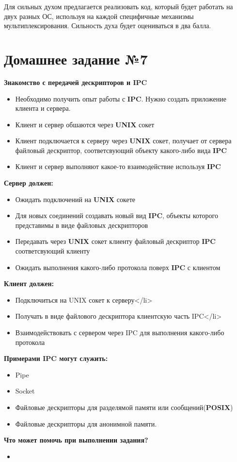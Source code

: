 \documentclass[../../lectures.tex]{subfiles}
\begin{document}
Для сильных духом предлагается реализовать код, который будет работать на двух разных ОС, используя на каждой специфичные механизмы мультиплексирования.
Сильность духа будет оцениваться в два балла.

\section{Домашнее задание №7}
\textbf{Знакомство с передачей дескрипторов и IPC}
\begin{itemize}
    \item Необходимо получить опыт работы с \textbf{IPC}. Нужно создать приложение клиента и сервера.
    \item Клиент и сервер обшаются через \textbf{UNIX} сокет
    \item Клиент подключается к серверу через \textbf{UNIX} сокет, получает от сервера файловый дескриптор, соответсвующий объекту какого-либо вида \textbf{IPC}
    \item Клиент и сервер выполняют какое-то взаимодействие используя \textbf{IPC}
\end{itemize}

\textbf{Сервер должен:}
\begin{itemize}
    \item Ожидать подключений на \textbf{UNIX} сокете
    \item Для новых соединений создавать новый вид \textbf{IPC}, объекты которого представимы в виде файловых дескрипторов
    \item Передавать через \textbf{UNIX} сокет клиенту файловый дескриптор \textbf{IPC} соответсвующий клиенту
    \item Ожидать выполнения какого-либо протокола поверх \textbf{IPC} с клиентом
\end{itemize}

\textbf{Клиент должен:}
\begin{itemize}
    \item Подключиться на UNIX сокет к серверу</li>
    \item Получать в виде файлового дескриптора клиентскую часть IPC</li>
    \item Взаимодействовать с сервером через IPC для выполнения какого-либо протокола
\end{itemize}

\textbf{Примерами IPC могут служить:}
\begin{itemize}
    \item Pipe
    \item Socket
    \item Файловые дескрипторы для разделямой памяти или сообщений(\textbf{POSIX})
    \item Файловые дескрипторы для анонимной памяти.
\end{itemize}

\textbf{Что может помочь при выполнении задания?}
\begin{itemize}
    \item {}
\end{itemize}
\end{document}
